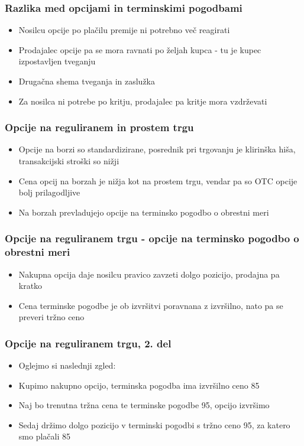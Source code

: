 \documentclass[14pt]{beamer}
\begin{document}
\begin{frame}
    \frametitle{Razlika med opcijami in terminskimi pogodbami}
    \begin{itemize}
        \item Nosilcu opcije po plačilu premije ni potrebno več reagirati
        \item Prodajalec opcije pa se mora ravnati po željah kupca - tu je kupec izpostavljen tveganju
        \pause
        \item Drugačna shema tveganja in zaslužka
        \pause
        \item Za nosilca ni potrebe po kritju, prodajalec pa kritje mora vzdrževati
    \end{itemize}
\end{frame}

\begin{frame}
    \frametitle{Opcije na reguliranem in prostem trgu}
    \begin{itemize}
        \item Opcije na borzi so standardizirane, posrednik pri trgovanju je klirinška hiša, transakcijski stroški so nižji
        \item Cena opcij na borzah je nižja kot na prostem trgu, vendar pa so OTC opcije bolj prilagodljive
        \item Na borzah prevladujejo opcije na terminsko pogodbo o obrestni meri
    \end{itemize}
\end{frame}

\begin{frame}
    \frametitle{Opcije na reguliranem trgu - opcije na terminsko pogodbo o obrestni meri}
    \begin{itemize}
        \item Nakupna opcija daje nosilcu pravico zavzeti dolgo pozicijo, prodajna pa kratko
        \item Cena terminske pogodbe je ob izvršitvi poravnana z izvršilno, nato pa se preveri tržno ceno
    \end{itemize}
\end{frame}

\begin{frame}
    \frametitle{Opcije na reguliranem trgu, 2. del}
        \begin{itemize}
            \item Oglejmo si naslednji zgled:
            \item Kupimo nakupno opcijo, terminska pogodba ima izvršilno ceno 85\textdollar
            \item Naj bo trenutna tržna cena te terminske pogodbe 95\textdollar, opcijo izvršimo
            \item Sedaj držimo dolgo pozicijo v terminski pogodbi s tržno ceno 95\textdollar, za katero smo plačali 85\textdollar
        \end{itemize}
\end{frame}
\end{document}
